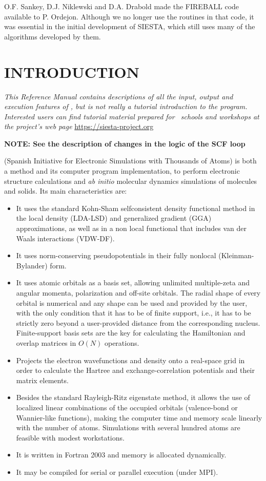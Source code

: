 O.F. Sankey, D.J. Niklewski and D.A. Drabold made the FIREBALL code
available to P. Ordejon.  Although we no longer use the routines in
that code, it was essential in the initial development of SIESTA,
which still uses many of the algorithms developed by them.

\newpage
\tableofcontents
\newpage

\section{INTRODUCTION}

\textit{This Reference Manual contains descriptions of all the input,
  output and execution features of \siesta, but is not really a
  tutorial introduction to the program. Interested users can find
  tutorial material prepared for \siesta\ schools and workshops at
  the project's web page} \url{https://siesta-project.org}


\textbf{NOTE: See the description of changes in the logic of the SCF loop}

\siesta{} (Spanish Initiative for
Electronic Simulations with
Thousands of Atoms) is both a method and its computer program implementation,
to perform electronic structure calculations and \textit{ab initio} molecular
dynamics simulations of molecules and solids. Its main characteristics are:
\begin{itemize}
\item
It uses the standard Kohn-Sham selfconsistent density functional
method in the local density (LDA-LSD) and generalized gradient (GGA)
approximations, as well as in a non local functional that includes
van der Waals interactions (VDW-DF).
\item
It uses norm-conserving pseudopotentials in their fully nonlocal
(Kleinman-Bylander) form.
\item
It uses atomic orbitals as a basis set, allowing unlimited multiple-zeta
and angular momenta, polarization and off-site orbitals. The radial
shape of every orbital is numerical and any shape can be used and provided
by the user, with the only condition that it has to be of finite support,
i.e., it has to be strictly zero beyond a user-provided distance from the
corresponding nucleus.
Finite-support basis sets are the key for calculating the Hamiltonian
and overlap matrices in $O(N)$ operations.
\item
Projects the electron wavefunctions and density onto a real-space
grid in order to calculate the Hartree and exchange-correlation
potentials and their matrix elements.
\item
Besides the standard Rayleigh-Ritz eigenstate method, it allows
the use of localized linear combinations of the occupied orbitals
(valence-bond or Wannier-like functions), making the computer
time and memory scale linearly with the number of atoms.
Simulations with several hundred atoms are feasible with
modest workstations.
\item
It is written in Fortran 2003 and memory is allocated dynamically.
\item
It may be compiled for serial or parallel execution (under MPI).

\end{itemize}

